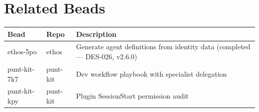 \documentclass[a4paper,10pt]{article}
\begin{document}
\section{Related Beads}
\label{sec:beads}

\begin{center}
\begin{tabularx}{\textwidth}{@{}llX@{}}
\toprule
\textbf{Bead} & \textbf{Repo} & \textbf{Description} \\
\midrule
ethos-5po & ethos & Generate agent definitions from identity data
  (completed --- DES-026, v2.6.0) \\
punt-kit-7k7 & punt-kit & Dev workflow playbook with specialist
  delegation \\
punt-kit-kpy & punt-kit & Plugin SessionStart permission audit \\
\bottomrule
\end{tabularx}
\end{center}
\end{document}

